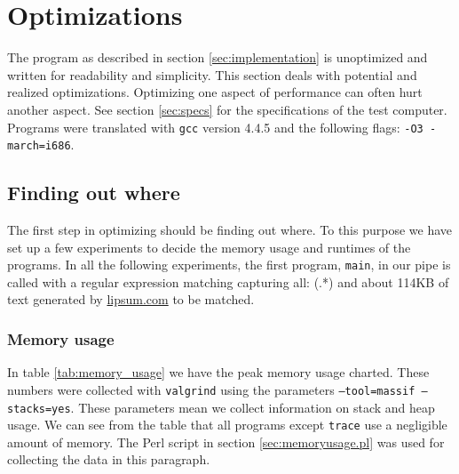 \section{Optimizations}

The program as described in section \vref{sec:implementation} is
unoptimized and written for readability and simplicity. This section
deals with potential and realized optimizations. Optimizing one aspect
of performance can often hurt another aspect. See section
\vref{sec:specs} for the specifications of the test computer. Programs
were translated with \texttt{gcc} version 4.4.5 and the following flags:
\texttt{-O3 -march=i686}.

\subsection{Finding out where}
\label{sec:finding_out_where}
The first step in optimizing should be finding out where. To this
purpose we have set up a few experiments to decide the memory usage
and runtimes of the programs. In all the following experiments, the
first program, \texttt{main}, in our pipe is called with a regular
expression matching capturing all: \textsf{(.*)} and about 114KB of
text generated by \url{lipsum.com} to be matched. 


\subsubsection{Memory usage}
In table \vref{tab:memory_usage} we have the peak memory usage
charted. These numbers were collected with \texttt{valgrind} using the
parameters \texttt{--tool=massif --stacks=yes}. These parameters mean
we collect information on stack and heap usage. We can see from the
table that all programs except \texttt{trace} use a negligible amount
of memory. The Perl script in section \vref{sec:memoryusage.pl} was
used for collecting the data in this paragraph.

